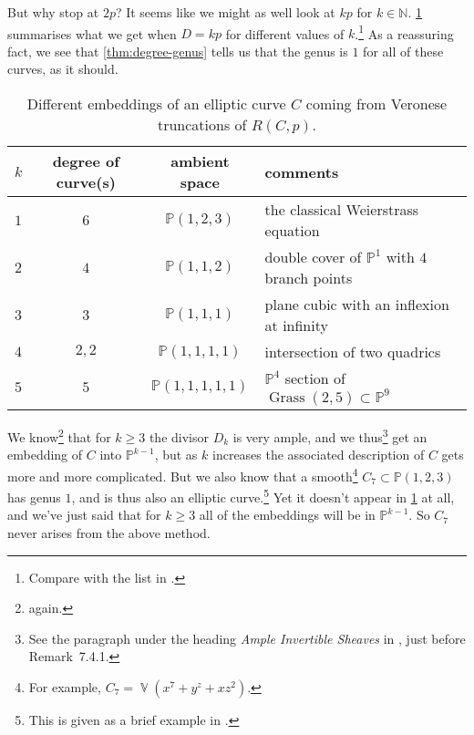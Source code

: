 \documentclass[10pt,notitlepage]{article}
\numberwithin{equation}{subsection}
\DeclareMathOperator{\van}{\mathbb{V}}
\newcommand{\pee}{\mathbb{P}}
\newcommand{\nn}{\mathbb{N}}
\begin{document}
\begin{example}
            But why stop at $2p$?
            It seems like we might as well look at $kp$ for $k\in\nn$.
            \cref{tab:elliptic-curves-truncations} summarises what we get when $D=kp$ for different values of $k$.\footnote{%
                Compare with the list in \cite[Section~12.4]{IanoFletcher:2015wc}.
            }
            As a reassuring fact, we see that \cref{thm:degree-genus} tells us that the genus is $1$ for all of these curves, as it should.

            \begin{table}[ht]
                \centering
                \begin{tabular}{lccl}
                    \toprule
                    $k$ & degree of curve(s) & ambient space & comments \\
                    \midrule
                    $1$ & $6$ & $\pee(1,2,3)$ & the classical Weierstrass equation \\
                    $2$ & $4$ & $\pee(1,1,2)$ & double cover of $\pee^1$ with $4$ branch points\\
                    $3$ & $3$ & $\pee(1,1,1)$ & plane cubic with an inflexion at infinity \\
                    $4$ & $2,2$ & $\pee(1,1,1,1)$ & intersection of two quadrics \\
                    $5$ & $5$ & $\pee(1,1,1,1,1)$ & $\pee^4$ section of $\operatorname{Grass}(2,5)\subset\pee^9$ \\
                    \bottomrule
                \end{tabular}
                \caption{Different embeddings of an elliptic curve $C$ coming from Veronese truncations of $R(C,p)$.}
                \label{tab:elliptic-curves-truncations}
            \end{table}

            We know\footnote{%
                \cite[Chapter~IV,~Corollary~3.2(b)]{Hartshorne:1977we} again.
            } that for $k\geqslant3$ the divisor $D_k$ is very ample, and we thus\footnote{%
                See the paragraph under the heading \emph{Ample Invertible Sheaves} in \cite[Chapter~II]{Hartshorne:1977we}, just before Remark~7.4.1.
            } get an embedding of $C$ into $\pee^{k-1}$, but as $k$ increases the associated description of $C$ gets more and more complicated.
            But we also know that a smooth\footnote{%
                For example, $C_7=\van(x^7+y^z+xz^2)$.
            } $C_7\subset\pee(1,2,3)$ has genus $1$, and is thus also an elliptic curve.\footnote{%
                This is given as a brief example in \cite[Note~6.15(i)]{IanoFletcher:2015wc}.
            }
            Yet it doesn't appear in \cref{tab:elliptic-curves-truncations} at all, and we've just said that for $k\geqslant3$ all of the embeddings will be in $\pee^{k-1}$.
            So $C_7$ never arises from the above method.
        \end{example}
\end{document}
